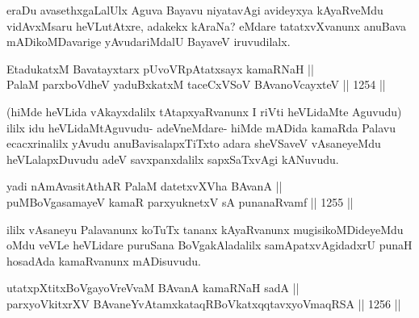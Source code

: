 \begin{artha}
eraDu avasethxgaLalUlx Aguva Bayavu niyatavAgi avideyxya kAyaRveMdu vidAvxMsaru heVLutAtxre, adakekx kAraNa? eMdare tatatxvXvanunx anuBava mADikoMDavarige yAvudariMdalU BayaveV iruvudilalx.
\end{artha}

\begin{shl}
EtadukatxM Bavatayxtarx pUvoVRpAtatxsayx kamaRNaH || \\
PalaM parxboVdheV yaduBxkatxM taceCxVSoV BAvanoVcayxteV \hfill || 1254 ||  
\end{shl}

\begin{artha}
(hiMde heVLida vAkayxdalilx tAtapxyaRvanunx I riVti heVLidaMte Aguvudu) ililx idu heVLidaMtAguvudu- adeVneMdare- hiMde mADida kamaRda Palavu ecacxrinalilx yAvudu anuBavisalapxTiTxto adara sheVSaveV vAsaneyeMdu heVLalapxDuvudu adeV savxpanxdalilx sapxSaTxvAgi kANuvudu.
\end{artha}


\begin{shl}
\footnotemark[1]yadi nAmAvasitAthAR PalaM datetxvXVha BAvanA || \\
puMBoVgasamayeV kamaR parxyuknetxV sA punanaRvamf \hfill || 1255 ||  
\end{shl}

\begin{artha}
ililx vAsaneyu Palavanunx koTuTx tananx kAyaRvanunx mugisikoMDideyeMdu oMdu veVLe heVLidare puruSana BoVgakAladalilx samApatxvAgidadxrU punaH hosadAda kamaRvanunx mADisuvudu.
\end{artha}

\begin{shl}
utatxpXtitxBoVgayoVreVvaM BAvanA kamaRNaH sadA || \\
parxyoVkitxrXV BAvaneYvA\s \s tamxkataqRBoVkatxqqtavxyoVmaqRSA \hfill || 1256 ||  
\end{shl}

